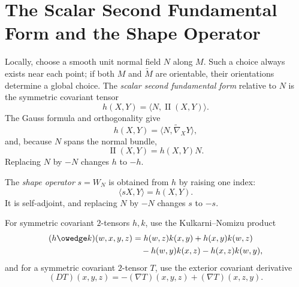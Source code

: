 \section{The Scalar Second Fundamental Form and the Shape Operator}

Locally, choose a smooth unit normal field $N$ along $M$. Such a choice always
exists near each point; if both $M$ and $\widetilde M$ are orientable, their
orientations determine a global choice. The \emph{scalar second fundamental
form} relative to $N$ is the symmetric covariant tensor
\begin{equation}
h(X,Y)=\langle N,\operatorname{II}(X,Y)\rangle. \tag{8.8}
\end{equation}
The Gauss formula and orthogonality give
\begin{equation}
h(X,Y)=\langle N,\widetilde\nabla_XY\rangle, \tag{8.9}
\end{equation}
and, because $N$ spans the normal bundle,
\begin{equation}
\operatorname{II}(X,Y)=h(X,Y)N. \tag{8.10}
\end{equation}
Replacing $N$ by $-N$ changes $h$ to $-h$.

The \emph{shape operator} $s=W_N$ is obtained from $h$ by raising one index:
\[
\langle sX,Y\rangle=h(X,Y).
\]
It is self-adjoint, and replacing $N$ by $-N$ changes $s$ to $-s$.

For symmetric covariant $2$-tensors $h,k$, use the Kulkarni--Nomizu product
\begin{align*}
(h\owedge k)(w,x,y,z)
&=h(w,z)k(x,y)+h(x,y)k(w,z)\\
&\quad-h(w,y)k(x,z)-h(x,z)k(w,y),
\end{align*}
and for a symmetric covariant $2$-tensor $T$, use the exterior covariant
derivative
\[
(DT)(x,y,z)=-(\nabla T)(x,y,z)+(\nabla T)(x,z,y).
\]


